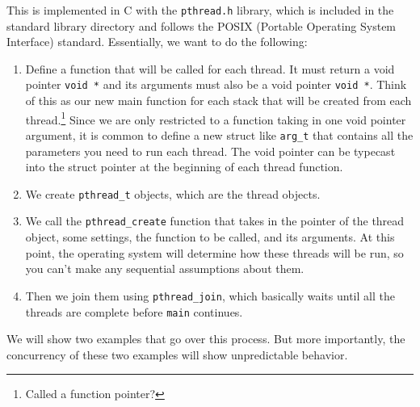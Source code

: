 \documentclass{article}
\begin{document}
    This is implemented in C with the \texttt{pthread.h} library, which is included in the standard library directory and follows the POSIX (Portable Operating System Interface) standard. Essentially, we want to do the following: 
    \begin{enumerate}
      \item Define a function that will be called for each thread. It must return a void pointer \texttt{void *} and its arguments must also be a void pointer \texttt{void *}. Think of this as our new main function for each stack that will be created from each thread.\footnote{Called a function pointer?} Since we are only restricted to a function taking in one void pointer argument, it is common to define a new struct like \texttt{arg\_t} that contains all the parameters you need to run each thread. The void pointer can be typecast into the struct pointer at the beginning of each thread function. 

      \item We create \texttt{pthread\_t} objects, which are the thread objects. 
      \item We call the \texttt{pthread\_create} function that takes in the pointer of the thread object, some settings, the function to be called, and its arguments. At this point, the operating system will determine how these threads will be run, so you can't make any sequential assumptions about them. 
      \item Then we join them using \texttt{pthread\_join}, which basically waits until all the threads are complete before \texttt{main} continues. 
    \end{enumerate}

    We will show two examples that go over this process. But more importantly, the concurrency of these two examples will show unpredictable behavior. 
\end{document}
